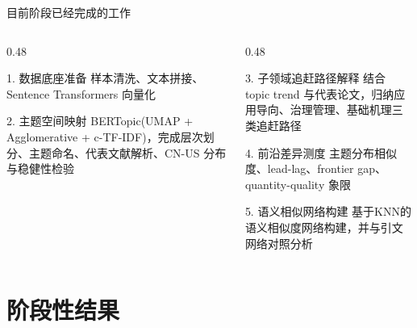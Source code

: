 \documentclass{beamer}
\begin{document}
\begin{frame}{目前阶段已经完成的工作}
    \begin{columns}[T]
        \begin{column}{0.48\linewidth}
            \begin{block}{1. 数据底座准备}
                \small
                样本清洗、文本拼接、Sentence Transformers 向量化
            \end{block}
            \begin{block}{2. 主题空间映射}
                \small
                BERTopic(UMAP + Agglomerative + c-TF-IDF)，完成层次划分、主题命名、代表文献解析、CN-US 分布与稳健性检验
            \end{block}
        \end{column}
        \begin{column}{0.48\linewidth}
            \begin{block}{3. 子领域追赶路径解释}
                \small
                结合 topic trend 与代表论文，归纳应用导向、治理管理、基础机理三类追赶路径
            \end{block}
            \begin{block}{4. 前沿差异测度}
                \small
                主题分布相似度、lead-lag、frontier gap、quantity-quality 象限
            \end{block}
            \begin{block}{5. 语义相似网络构建}
                \small
                基于KNN的语义相似度网络构建，并与引文网络对照分析
            \end{block}
        \end{column}
    \end{columns}
\end{frame}

\section{阶段性结果}
\end{document}
